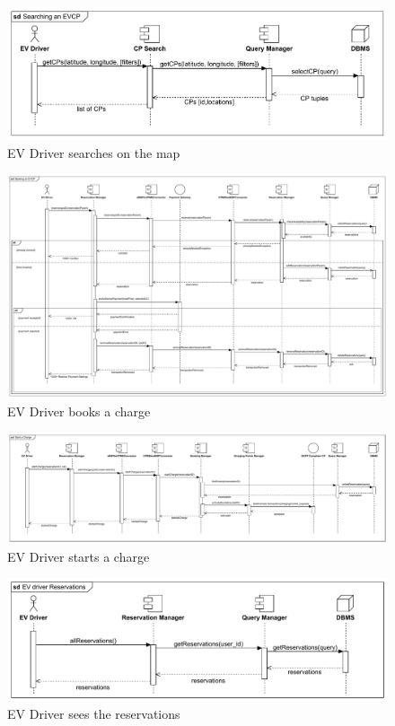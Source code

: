 \begin{figure}[H]
    \centering
    \includegraphics[scale=0.55]{src/runtimeVIew/eMSP_Search.pdf}
    \caption{EV Driver searches on the map}
\end{figure}

\begin{figure}[H]
    \centering
    \hspace*{-2cm}
    \includegraphics[scale=0.48]{src/runtimeVIew/eMSP_Book.pdf}
    \caption{EV Driver books a charge}
\end{figure}

\begin{figure}[H]
    \centering
    \hspace*{-2cm}
    \includegraphics[scale=0.50]{src/runtimeVIew/eMSP_StartACharge.pdf}
    \caption{EV Driver starts a charge}
\end{figure}

\begin{figure}[H]
    \centering
    \includegraphics[scale=0.55]{src/runtimeVIew/eMSP_Reservations.pdf}
    \caption{EV Driver sees the reservations}
\end{figure}

